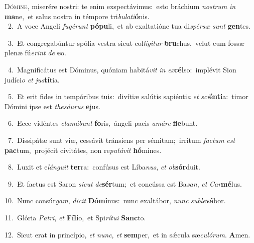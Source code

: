 \lettrine{\initial\textcolor{\initialcolor}{D}}{ómine,} miserére nostri: te enim exspectávimus:~\dagger esto bráchium \textit{nos}\-\textit{trum} \textit{in} \textbf{ma}\-ne,~\star et salus nostra in témpore tri\-\textit{bu}\-\textit{la}\textit{ti}\textbf{ó}nis.\\
{\numbfont\textcolor{\numbcolor}{~2.}}~A voce Angeli \textit{fu}\-\textit{gé}\textit{runt} \textbf{pó}\-\textbf{pu}li,~\star et ab exaltatióne tua di\-\textit{spér}\-\textit{sæ} \textit{sunt} \textbf{gen}\-tes.\par
{\numbfont\textcolor{\numbcolor}{~3.}}~Et congregabúntur spólia vestra sicut col\-\textit{lí}\-\textit{gi}\textit{tur} \textbf{bru}\-chus,~\star velut cum fossæ plenæ fú\-\textit{e}\-\textit{rint} \textit{de} \textbf{e}\-o.\par
{\numbfont\textcolor{\numbcolor}{~4.}}~Magnificátus est Dóminus, quóniam habitá\textit{vit} \textit{in} \textit{ex}\-\textbf{cél}so:~\star implévit Sion judíci\textit{o} \textit{et} \textit{jus}\-\textbf{tí}tia.\par
{\numbfont\textcolor{\numbcolor}{~5.}}~Et erit fides in tempóribus tuis:~\dagger divítiæ salútis sapiénti\textit{a} \textit{et} \textit{sci}\-\textbf{én}\textbf{ti}a:~\star timor Dómini ipse est \textit{the}\-\textit{sáu}\textit{rus} \textbf{e}\-jus.\par
{\numbfont\textcolor{\numbcolor}{~6.}}~Ecce vidéntes \textit{cla}\-\textit{má}\textit{bunt} \textbf{fo}\-ris,~\star ángeli pacis \textit{a}\-\textit{má}\textit{re} \textbf{fle}\-bunt.\par
{\numbfont\textcolor{\numbcolor}{~7.}}~Dissipátæ sunt viæ, cessávit tránsiens per sémitam;~\dagger irritum \textit{fac}\-\textit{tum} \textit{est} \textbf{pac}\-tum,~\star projécit civitátes, non re\-\textit{pu}\-\textit{tá}\textit{vit} \textbf{hó}\-mines.\par
{\numbfont\textcolor{\numbcolor}{~8.}}~Luxit et e\-\textit{lán}\-\textit{gu}\textit{it} \textbf{ter}\-ra:~\star confúsus est Líba\-\textit{nus}\-, \textit{et} \textit{ob}\-\textbf{sór}duit.\par
{\numbfont\textcolor{\numbcolor}{~9.}}~Et factus est Saron \textit{sic}\-\textit{ut} \textit{de}\-\textbf{sér}tum;~\star et concússa est Ba\-\textit{san}\-, \textit{et} \textit{Car}\-\textbf{mé}lus.\par
{\numbfont\textcolor{\numbcolor}{10.}}~Nunc consúr\-\textit{gam}\-, \textit{di}\-\textit{cit} \textbf{Dó}\-\textbf{mi}nus:~\star nunc exaltábor, \textit{nunc} \textit{sub}\-\textit{le}\textbf{vá}bor.\par
{\numbfont\textcolor{\numbcolor}{11.}}~Glória \textit{Pa}\-\textit{tri}, \textit{et} \textbf{Fí}\-\textbf{li}o,~\star et Spi\-\textit{rí}\-\textit{tu}\textit{i} \textbf{Sanc}\-to.\par
{\numbfont\textcolor{\numbcolor}{12.}}~Sicut erat in princípio, \textit{et} \textit{nunc}\-, \textit{et} \textbf{sem}\-per,~\star et in sǽcula sæ\-\textit{cu}\-\textit{ló}\textit{rum}. \textbf{A}\-men.\par
